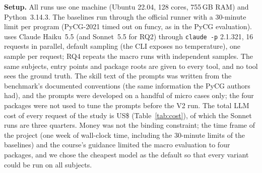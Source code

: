 \textbf{Setup.} All runs use one machine (Ubuntu 22.04, 128 cores, 755\,GB
RAM) and Python~3.14.3. The baselines run through the official runner with a
30-minute limit per program (PyCG-2021 timed out on funcy, as in
the PyCG evaluation). \nscg uses Claude Haiku~5.5 (and Sonnet~5.5 for RQ2)
through \texttt{claude -p} 2.1.321, 16 requests in parallel, default sampling
(the CLI exposes no temperature), one sample per request; RQ4 repeats the
macro runs with independent samples. The same subjects, entry points and
package roots are given to every tool, and no tool sees the ground truth. The
skill text of the prompts was written from the benchmark's documented
conventions (the same information the PyCG authors had), and the prompts were
developed on a handful of micro cases only; the four packages were not used to
tune the prompts before the V2 run. The total LLM cost of every request of the
study is US\$ (Table~\ref{tab:cost}), of which the
Sonnet runs are three quarters. Money was not the binding constraint; the time
frame of the project (one week of wall-clock time, including the 30-minute
limits of the baselines) and the course's guidance limited the macro
evaluation to four packages, and we chose the cheapest model as the default so
that every variant could be run on all subjects.
